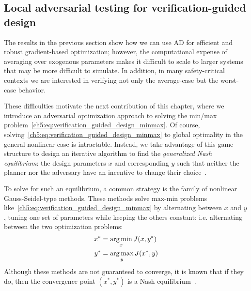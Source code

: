 \subsection{Local adversarial testing for verification-guided design}

The results in the previous section show how we can use AD for efficient and robust gradient-based optimization; however, the computational expense of averaging over exogenous parameters makes it difficult to scale to larger systems that may be more difficult to simulate. In addition, in many safety-critical contexts we are interested in verifying not only the average-case but the worst-case behavior.

These difficulties motivate the next contribution of this chapter, where we introduce an adversarial optimization approach to solving the min/max problem~\eqref{ch5:eq:verification_guided_design_minmax}. Of course, solving~\eqref{ch5:eq:verification_guided_design_minmax} to global optimality in the general nonlinear case is intractable. Instead, we take advantage of this game structure to design an iterative algorithm to find the \textit{generalized Nash equilibrium}: the design parameters $x$ and corresponding $y$ such that neither the planner nor the adversary have an incentive to change their choice~\cite{facchineiGeneralizedNashEquilibrium2007a}.

To solve for such an equilibrium, a common strategy is the family of nonlinear Gauss-Seidel-type methods. These methods solve max-min problems like~\eqref{ch5:eq:verification_guided_design_minmax} by alternating between $x$ and $y$, tuning one set of parameters while keeping the others constant; i.e. alternating between the two optimization problems:
\begin{subequations}
    \begin{align}\label{ch5:eq:gauss_seidel}
        x^* & = \operatorname*{arg\,min}_x J(x, y^*) \\
        y^* & = \operatorname*{arg\,max}_y J(x^*, y)
    \end{align}
\end{subequations}
Although these methods are not guaranteed to converge, it is known that if they do, then the convergence point $(x^*, y^*)$ is a Nash equilibrium~\cite{facchineiGeneralizedNashEquilibrium2007a}.

